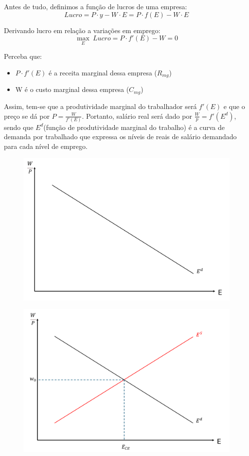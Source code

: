 \documentclass[a4paper,12pt]{article}[abntex2]
\begin{document}
Antes de tudo, definimos a função de lucros de uma empresa:
\[
Lucro = P\cdot y-W\cdot E=P\cdot f(E)-W\cdot E
\]

Derivando lucro em relação a variações em emprego:
\[
\max_{E} \ Lucro=P \cdot f'(E) - W=0
\]

Perceba que: \begin{itemize}
    \item \(P \cdot f'(E)\) é a receita marginal dessa empresa (\(R_{mg}\))
    \item W é o custo marginal dessa empresa (\(C_{mg}\))
\end{itemize}

Assim, tem-se que a produtividade marginal do trabalhador será \(f'(E)\) e que o preço se dá por \(P=\frac{W}{f'(E)}\). Portanto, salário real será dado por \(\frac{W}{p}=f'(E^d)\), sendo que \(E^d\)(função de produtividade marginal do trabalho) é a curva de demanda por trabalhado que expressa os níveis de reais de salário demandado para cada nível de emprego.

\begin{figure}[H]
    \centering
    \includegraphics[width=0.7\linewidth]{Imagens/a5i4.png}
\end{figure}

\begin{figure}[H]
    \centering
    \includegraphics[width=0.7\linewidth]{Imagens/a5i5.png}
\end{figure}
\end{document}
